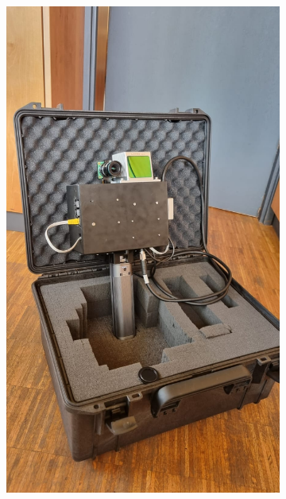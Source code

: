 \documentclass[english, bachelor, utf8]{base/thesis_telematics}
\begin{document}
\begin{figure}[h!]
    \centering
    \begin{subfigure}[b]{0.4\textwidth}
        \centering
        \includegraphics[width=\textwidth]{pics/handheld/WhatsApp Image 2025-09-16 at 15.05.09.jpeg}
    \end{subfigure}
    \hfill
    \begin{subfigure}[b]{0.4\textwidth}
        \centering

\end{subfigure}
\end{figure}
\end{document}
